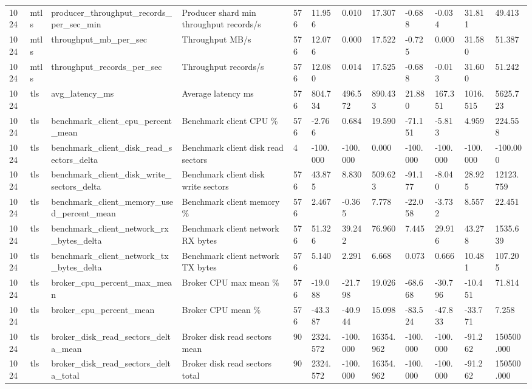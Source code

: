 \begin{longtable}{llllllllllll}
1024 & mtls & producer\_throughput\_records\_per\_sec\_min & Producer shard min throughput records/s & 576 & 11.956 & 0.010 & 17.307 & -0.688 & -0.034 & 31.811 & 49.413 \\
1024 & mtls & throughput\_mb\_per\_sec & Throughput MB/s & 576 & 12.076 & 0.000 & 17.522 & -0.725 & 0.000 & 31.580 & 51.387 \\
1024 & mtls & throughput\_records\_per\_sec & Throughput records/s & 576 & 12.080 & 0.014 & 17.525 & -0.688 & -0.013 & 31.600 & 51.242 \\
1024 & tls & avg\_latency\_ms & Average latency ms & 576 & 804.734 & 496.572 & 890.433 & 21.880 & 167.351 & 1016.515 & 5625.723 \\
1024 & tls & benchmark\_client\_cpu\_percent\_mean & Benchmark client CPU \% & 576 & -2.766 & 0.684 & 19.590 & -71.151 & -5.813 & 4.959 & 224.558 \\
1024 & tls & benchmark\_client\_disk\_read\_sectors\_delta & Benchmark client disk read sectors & 4 & -100.000 & -100.000 & 0.000 & -100.000 & -100.000 & -100.000 & -100.000 \\
1024 & tls & benchmark\_client\_disk\_write\_sectors\_delta & Benchmark client disk write sectors & 576 & 43.875 & 8.830 & 509.623 & -91.177 & -8.040 & 28.925 & 12123.759 \\
1024 & tls & benchmark\_client\_memory\_used\_percent\_mean & Benchmark client memory \% & 576 & 2.467 & -0.365 & 7.778 & -22.058 & -3.732 & 8.557 & 22.451 \\
1024 & tls & benchmark\_client\_network\_rx\_bytes\_delta & Benchmark client network RX bytes & 576 & 51.326 & 39.242 & 76.960 & 7.445 & 29.916 & 43.278 & 1535.639 \\
1024 & tls & benchmark\_client\_network\_tx\_bytes\_delta & Benchmark client network TX bytes & 576 & 5.140 & 2.291 & 6.668 & 0.073 & 0.666 & 10.481 & 107.205 \\
1024 & tls & broker\_cpu\_percent\_max\_mean & Broker CPU max mean \% & 576 & -19.088 & -21.798 & 19.026 & -68.668 & -30.796 & -10.451 & 71.814 \\
1024 & tls & broker\_cpu\_percent\_mean & Broker CPU mean \% & 576 & -43.387 & -40.944 & 15.098 & -83.524 & -47.833 & -33.771 & 7.258 \\
1024 & tls & broker\_disk\_read\_sectors\_delta\_mean & Broker disk read sectors mean & 90 & 2324.572 & -100.000 & 16354.962 & -100.000 & -100.000 & -91.262 & 150500.000 \\
1024 & tls & broker\_disk\_read\_sectors\_delta\_total & Broker disk read sectors total & 90 & 2324.572 & -100.000 & 16354.962 & -100.000 & -100.000 & -91.262 & 150500.000 \\

\end{longtable}
